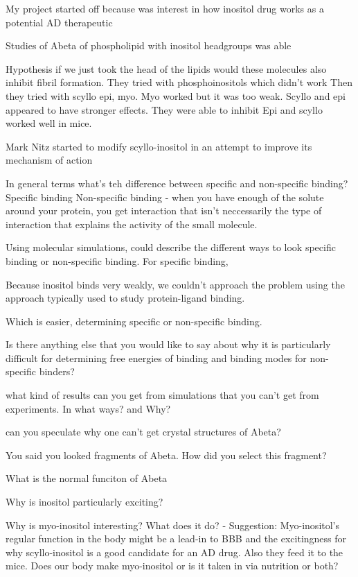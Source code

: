 My project started off because was interest in how inositol drug works as a potential AD therapeutic

Studies of Abeta of phospholipid with inositol headgroups was able 

Hypothesis if we just took the head of the lipids would these molecules also inhibit fibril formation.
They tried with phosphoinositols which didn't work
Then they tried with scyllo epi, myo. Myo worked but it was too weak. Scyllo and epi appeared to have stronger effects. They were able to inhibit 
Epi and scyllo worked well in mice. 


Mark Nitz started to modify scyllo-inositol in an attempt to improve its mechanism of action


In general terms what's teh difference between specific and non-specific binding?
Specific binding 
Non-specific binding - when you have enough of the solute around your protein, you get interaction that isn't neccessarily the type of interaction that explains the activity of the small molecule.

Using molecular simulations, could describe the different ways to look specific binding or non-specific binding.
For specific binding, 

Because inositol binds very weakly, we couldn't approach the problem using the approach typically used to study protein-ligand binding.

Which is easier, determining specific or non-specific binding.  

Is there anything else that you would like to say about why it is particularly difficult for determining free energies of binding and binding modes for non-specific binders?


what kind of results can you get from simulations that you can't get from experiments. In what ways? and Why?

can you speculate why one can't get crystal structures of Abeta?

You said you looked fragments of Abeta. How did you select this fragment?

What is the normal funciton of Abeta


Why is inositol particularly exciting?

Why is myo-inositol interesting? What does it do?
	- Suggestion: Myo-inositol's regular function in the body might be a lead-in to BBB and the excitingness for why scyllo-inositol is a good candidate for an AD drug.
		      Also they feed it to the mice.
Does our body make myo-inositol or is it taken in via nutrition or both?

